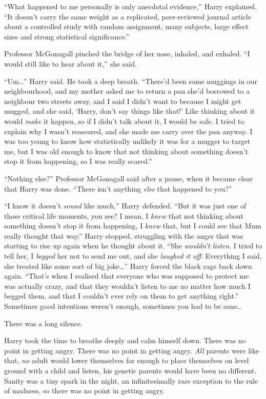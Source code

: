 “What happened to me personally is only anecdotal evidence,” Harry explained. “It doesn’t carry the same weight as a replicated, peer-reviewed journal article about a controlled study with random assignment, many subjects, large effect sizes and strong statistical significance.”

Professor McGonagall pinched the bridge of her nose, inhaled, and exhaled. “I would still like to hear about it,” she said.

“Um…” Harry said. He took a deep breath. “There’d been some muggings in our neighbourhood, and my mother asked me to return a pan she’d borrowed to a neighbour two streets away, and I said I didn’t want to because I might get mugged, and she said, ‘Harry, don’t say things like that!’ Like thinking about it would \emph{make} it happen, so if I didn’t talk about it, I would be safe. I tried to explain why I wasn’t reassured, and she made me carry over the pan anyway. I was too young to know how statistically unlikely it was for a mugger to target me, but I was old enough to know that not thinking about something doesn’t stop it from happening, so I was really scared.”

“Nothing else?” Professor McGonagall said after a pause, when it became clear that Harry was done. “There isn’t anything \emph{else} that happened to you?”

“I know it doesn’t \emph{sound} like much,” Harry defended. “But it was just one of those critical life moments, you see? I mean, I \emph{knew} that not thinking about something doesn’t stop it from happening, I \emph{knew} that, but I could see that Mum really thought that way.” Harry stopped, struggling with the anger that was starting to rise up again when he thought about it. “She \emph{wouldn’t listen}. I tried to tell her, I \emph{begged} her not to send me out, and she \emph{laughed it off}. Everything I said, she treated like some sort of big joke…” Harry forced the black rage back down again. “That’s when I realised that everyone who was supposed to protect me was actually crazy, and that they wouldn’t listen to me no matter how much I begged them, and that I couldn’t ever rely on them to get anything right.” Sometimes good intentions weren’t enough, sometimes you had to be sane…

There was a long silence.

Harry took the time to breathe deeply and calm himself down. There was no point in getting angry. There was no point in getting angry. \emph{All} parents were like that, \emph{no} adult would lower themselves far enough to place themselves on level ground with a child and listen, his genetic parents would have been no different. Sanity was a tiny spark in the night, an infinitesimally rare exception to the rule of madness, so there was no point in getting angry.

